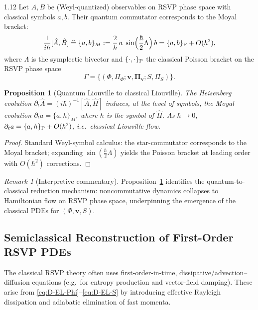 \documentclass[12pt,a4paper]{article}
\numberwithin{equation}{section}
\newtheorem{proposition}{Proposition}[section]
\theoremstyle{remark}
\newtheorem{remark}{Remark}[section]
\theoremstyle{definition}
\begin{document}
\begin{spacing}{1.12}
Let $A,B$ be (Weyl-quantized) observables on RSVP phase space with classical symbols $a,b$. Their quantum commutator corresponds to the Moyal bracket:
\begin{equation}\label{eq:D-moyal}
\frac{1}{i\hbar}[ \hat{A},\hat{B} ] \;\widehat{=}\; \{a,b\}_M
:= \frac{2}{\hbar}\,a\;\sin\!\Big(\frac{\hbar}{2}\Lambda\Big)\, b
= \{a,b\}_{\rm P} + O(\hbar^2),
\end{equation}
where $\Lambda$ is the symplectic bivector and $\{\cdot,\cdot\}_{\rm P}$ the classical Poisson bracket on the RSVP phase space
\[
\Gamma=\{(\Phi,\Pi_\Phi;\mathbf{v},\bm{\Pi}_{\!\mathbf{v}};S,\Pi_S)\}.
\]

\begin{proposition}[Quantum Liouville to classical Liouville]\label{prop:D-Liouville}
The Heisenberg evolution $\partial_t \hat{A}=(i\hbar)^{-1}[\hat{A},\hat{H}]$ induces, at the level of symbols, the Moyal evolution
$\partial_t a = \{a,h\}_M$, where $h$ is the symbol of $\hat{H}$. As $\hbar\to 0$, $\partial_t a = \{a,h\}_{\rm P} + O(\hbar^2)$, i.e.\ classical Liouville flow.
\end{proposition}

\begin{proof}
Standard Weyl-symbol calculus: the star-commutator corresponds to the Moyal bracket; expanding $\sin(\frac{\hbar}{2}\Lambda)$ yields the Poisson bracket at leading order with $O(\hbar^2)$ corrections.
\end{proof}

\begin{remark}[Interpretive commentary]
Proposition~\ref{prop:D-Liouville} identifies the quantum-to-classical reduction mechanism: noncommutative dynamics collapses to Hamiltonian flow on RSVP phase space, underpinning the emergence of the classical PDEs for $(\Phi,\mathbf{v},S)$.
\end{remark}

\subsection{Semiclassical Reconstruction of First-Order RSVP PDEs}\label{sec:D-firstorder}

The classical RSVP theory often uses first-order-in-time, dissipative/advection--diffusion equations (e.g.\ for entropy production and vector-field damping). These arise from \eqref{eq:D-EL-Phi}--\eqref{eq:D-EL-S} by introducing effective Rayleigh dissipation and adiabatic elimination of fast momenta.


\end{spacing}
\end{document}
